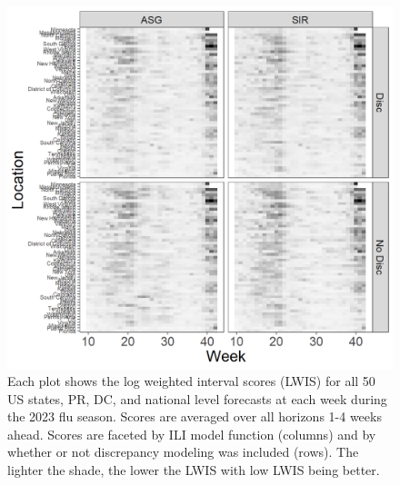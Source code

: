 \documentclass[ba]{imsart}
\theoremstyle{plain}
\theoremstyle{definition}
\theoremstyle{remark}
\begin{document}
\begin{supplement}
\begin{figure}[hbt!]
    
    \centering
    \includegraphics[scale = .7]{Images/lwis_by_traj_loc.png}
    \caption{Each plot shows the log weighted interval scores (LWIS) 
    for all 50 US states, PR, DC, and national level forecasts at each week 
    during the 2023 flu season. Scores are averaged over all horizons 1-4 
    weeks ahead. Scores are faceted by ILI model function (columns) and by 
    whether or not discrepancy modeling was included (rows). The lighter the 
    shade, the lower the LWIS with low LWIS being better.}
    \label{fig:lwis_by_traj_loc}
\end{figure}





\end{supplement}
\end{document}
